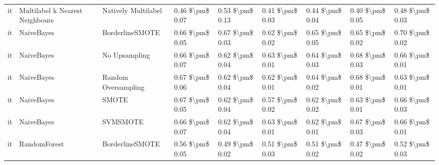 \begin{tabular}{lllllllll}
      it & Multilabel k Nearest Neighbours &           Natively Multilabel &     0.46 \$\textbackslash pm\$ 0.07 &           0.53 \$\textbackslash pm\$ 0.13 &       0.41 \$\textbackslash pm\$ 0.03 &        0.44 \$\textbackslash pm\$ 0.04 &                         0.40 \$\textbackslash pm\$ 0.05 &     0.48 \$\textbackslash pm\$ 0.03 \\
      it &                      NaiveBayes &               BorderlineSMOTE &     0.66 \$\textbackslash pm\$ 0.05 &           0.67 \$\textbackslash pm\$ 0.03 &       0.62 \$\textbackslash pm\$ 0.02 &        0.65 \$\textbackslash pm\$ 0.05 &                         0.65 \$\textbackslash pm\$ 0.02 &     0.70 \$\textbackslash pm\$ 0.02 \\
      it &                      NaiveBayes &                 No Upsampling &     0.66 \$\textbackslash pm\$ 0.07 &           0.62 \$\textbackslash pm\$ 0.04 &       0.63 \$\textbackslash pm\$ 0.01 &        0.64 \$\textbackslash pm\$ 0.03 &                         0.68 \$\textbackslash pm\$ 0.03 &     0.66 \$\textbackslash pm\$ 0.01 \\
      it &                      NaiveBayes &           Random Oversampling &     0.67 \$\textbackslash pm\$ 0.06 &           0.62 \$\textbackslash pm\$ 0.04 &       0.62 \$\textbackslash pm\$ 0.01 &        0.64 \$\textbackslash pm\$ 0.02 &                         0.68 \$\textbackslash pm\$ 0.01 &     0.63 \$\textbackslash pm\$ 0.01 \\
      it &                      NaiveBayes &                         SMOTE &     0.67 \$\textbackslash pm\$ 0.05 &           0.62 \$\textbackslash pm\$ 0.04 &       0.57 \$\textbackslash pm\$ 0.02 &        0.62 \$\textbackslash pm\$ 0.02 &                         0.63 \$\textbackslash pm\$ 0.01 &     0.66 \$\textbackslash pm\$ 0.03 \\
      it &                      NaiveBayes &                      SVMSMOTE &     0.66 \$\textbackslash pm\$ 0.07 &           0.62 \$\textbackslash pm\$ 0.04 &       0.63 \$\textbackslash pm\$ 0.01 &        0.62 \$\textbackslash pm\$ 0.01 &                         0.67 \$\textbackslash pm\$ 0.03 &     0.66 \$\textbackslash pm\$ 0.01 \\
      it &                    RandomForest &               BorderlineSMOTE &     0.56 \$\textbackslash pm\$ 0.05 &           0.49 \$\textbackslash pm\$ 0.02 &       0.51 \$\textbackslash pm\$ 0.03 &        0.51 \$\textbackslash pm\$ 0.02 &                         0.47 \$\textbackslash pm\$ 0.02 &     0.52 \$\textbackslash pm\$ 0.03 \\

\end{tabular}
